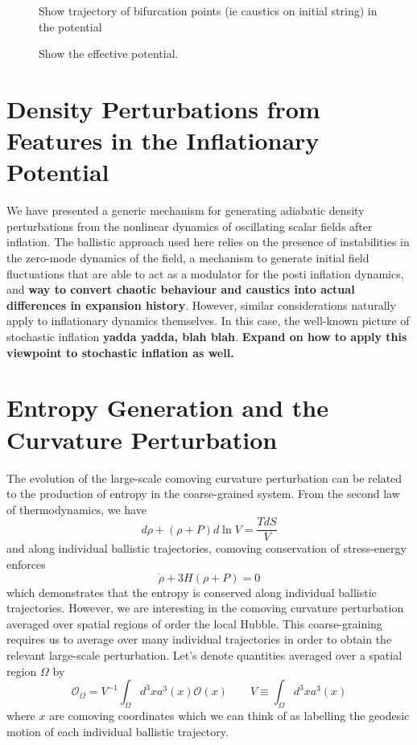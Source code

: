 \documentclass[11pt,a4paper]{article}
\begin{document}
\begin{figure}
  \caption{Show trajectory of bifurcation points (ie caustics on initial string) in the potential}
\end{figure}

\begin{figure}
  \caption{Show the effective potential.}
\end{figure}

\section{Density Perturbations from Features in the Inflationary Potential}
We have presented a generic mechanism for generating adiabatic density perturbations from the nonlinear dynamics of oscillating scalar fields after inflation.
The ballistic approach used here relies on the presence of instabilities in the zero-mode dynamics of the field,
a mechanism to generate initial field fluctuations that are able to act as a modulator for the posti inflation dynamics,
and {\bf way to convert chaotic behaviour and caustics into actual differences in expansion history}.
However, similar considerations naturally apply to inflationary dynamics themselves.
In this case, the well-known picture of stochastic inflation {\bf yadda yadda, blah blah}.
{\bf Expand on how to apply this viewpoint to stochastic inflation as well.}


\section{Entropy Generation and the Curvature Perturbation}
The evolution of the large-scale comoving curvature perturbation can be related to the production of entropy in the coarse-grained system.
From the second law of thermodynamics, we have
\begin{equation}
  d\rho + (\rho+P)d\ln V = \frac{TdS}{V}
\end{equation}
and along individual ballistic trajectories, comoving conservation of stress-energy enforces
\begin{equation}
  \dot{\rho} + 3H(\rho+P) = 0
\end{equation}
which demonstrates that the entropy is conserved along individual ballistic trajectories.
However, we are interesting in the comoving curvature perturbation averaged over spatial regions of order the local Hubble.
This coarse-graining requires us to average over many individual trajectories in order to obtain the relevant large-scale perturbation.
Let's denote quantities averaged over a spatial region $\Omega$ by
\begin{equation}
  \mathcal{O}_\Omega = V^{-1}\int_\Omega d^3x a^3(x)\mathcal{O}(x) \qquad V \equiv \int_\Omega d^3x a^3(x)
\end{equation}
where $x$ are comoving coordinates which we can think of as labelling the geodesic motion of each individual ballistic trajectory.
\end{document}

